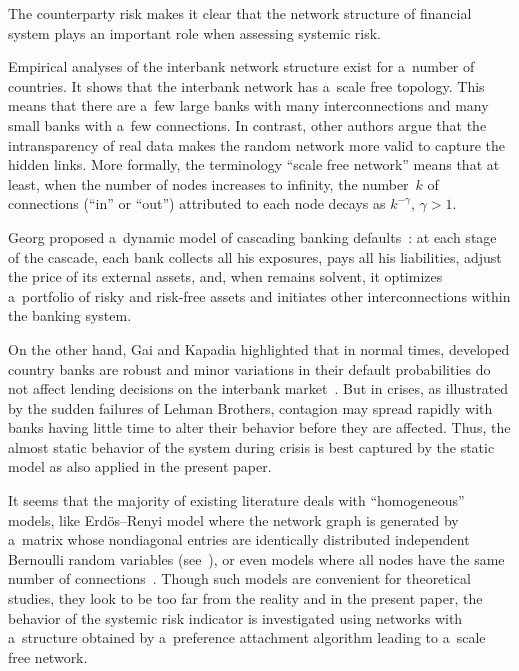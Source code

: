 \begin{multicols}{2}
The counterparty risk makes it clear that the network structure of financial 
system plays an important role when assessing systemic risk.

Empirical analyses of the interbank network structure exist for a~number of 
countries. It shows that the interbank network has a~scale free topology. This 
means that there are a~few large banks with many interconnections and many small 
banks with  a~few connections. In contrast, other authors argue that the 
intransparency of real data makes the random network more valid to capture the 
hidden links. More formally, the terminology 
``scale free network'' means that at least, when the number of nodes increases to 
infinity, 
the number~$k$ of connections (``in'' or ``out'')  attributed to each node decays as 
$k^{-\gamma}$, $\gamma >1$.  

    

Georg proposed a~dynamic model of cascading banking defaults~\cite{Co}: 
at each stage of the cascade, each bank collects all his exposures, pays all his 
liabilities, adjust the price of its external assets, and, when remains solvent, 
it optimizes a~portfolio of risky and risk-free assets and initiates other 
interconnections within the banking system.

On the other hand, Gai and Kapadia highlighted that in normal times, 
developed country banks are robust and minor variations in their default 
probabilities do not affect lending decisions on the interbank market~\cite{7a}. But in 
crises, as illustrated by the sudden failures of Lehman Brothers, contagion may 
spread rapidly with banks having little time to alter their behavior before they 
are affected. Thus, the almost static behavior of the system during crisis is 
best captured by the static model as also applied in the present paper.

It seems that the majority of existing literature  deals with ``homogeneous''
models, like Erd\"os--Renyi model where the network graph is generated by 
a~matrix whose nondiagonal entries are identically distributed independent  
Bernoulli random variables (see~\cite{GK}), or even models where 
all nodes have the same number of connections~\cite{MA}.   Though such models 
are  convenient 
for theoretical studies, they look to be too far from the reality and in the 
present paper,  the behavior of the systemic risk indicator is investigated using 
networks with a~structure obtained by a~preference attachment algorithm leading 
to a~scale free network.  


\end{multicols}
